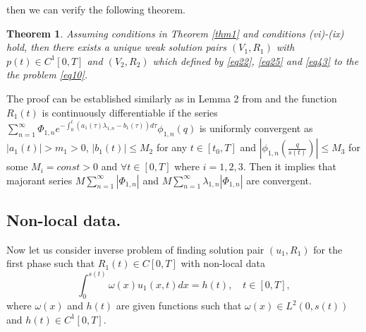 \documentclass[preprint,12pt,authoryear]{elsarticle}
\newtheorem{theorem}{Theorem}
\begin{document}
then we can verify the following theorem.
\begin{theorem}\label{thm2}
    Assuming conditions in Theorem \ref{thm1} and conditions (vi)-(ix) hold, then there exists a unique weak solution pairs $(V_1,R_1)$  with $p(t)\in C^1[0,T]$ and $(V_2,R_2)$ which defined by \eqref{eq22}, \eqref{eq25} and \eqref{eq43} to the the problem \eqref{eq10}. 
\end{theorem}
The proof can be established similarly as in Lemma 2 from \cite{20} and the function $R_1(t)$ is continuously differentiable if the series $\sum_{n=1}^{\infty}\Phi_{1,n}e^{-\int_0^t(a_1(\tau)\lambda_{1,n}-b_1(\tau))d\tau}\phi_{1,n}(q)$ is uniformly convergent as $|a_1(t)|>m_1>0$, $|b_1(t)|\leq M_2$  for any $t\in [t_0,T]$ and $\left|\phi_{1,n}\left(\frac{q}{s(t)}\right)\right|\leq M_3$ for some $M_i=const>0$ and $\forall t\in[0,T]$ where $i=1,2,3$. Then it implies that majorant series $M\sum_{n=1}^{\infty}|\Phi_{1,n}|$ and $M\sum_{n=1}^{\infty}\lambda_{1,n}|\Phi_{1,n}|$ are convergent.



\subsection{Non-local data.}\label{sec3} Now let us consider inverse problem of finding solution pair $(u_1,R_1)$ for the first phase such that $R_1(t)\in C[0,T]$ with non-local data 
\begin{equation}\label{eq44}
    \int_0^{s(t)}\omega(x)u_1(x,t)dx=h(t),\quad t\in[0,T],
\end{equation}
where $\omega(x)$ and $h(t)$ are given functions such that $\omega(x)\in L^2(0,s(t))$ and $h(t)\in C^1[0,T]$. 
\end{document}

